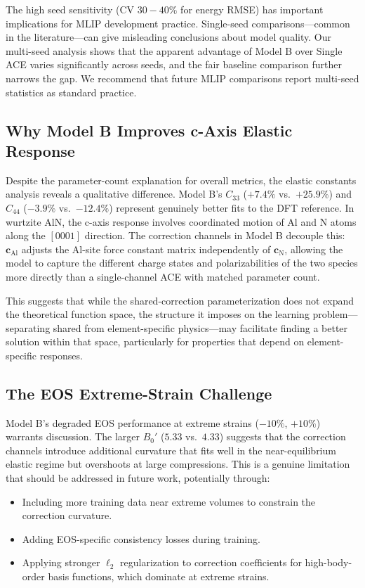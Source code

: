 \documentclass[twoside,prb,aps,floatfix,superscriptaddress,longbibliography]{revtex4-2}
\begin{document}
The high seed sensitivity (CV $30{-}40\%$ for energy RMSE) has important implications for MLIP development practice. Single-seed comparisons---common in the literature---can give misleading conclusions about model quality. Our multi-seed analysis shows that the apparent advantage of Model B over Single ACE varies significantly across seeds, and the fair baseline comparison further narrows the gap. We recommend that future MLIP comparisons report multi-seed statistics as standard practice.

\subsection{Why Model B Improves c-Axis Elastic Response}

Despite the parameter-count explanation for overall metrics, the elastic constants analysis reveals a qualitative difference. Model B's $C_{33}$ ($+7.4\%$ vs.\ $+25.9\%$) and $C_{44}$ ($-3.9\%$ vs.\ $-12.4\%$) represent genuinely better fits to the DFT reference. In wurtzite AlN, the c-axis response involves coordinated motion of Al and N atoms along the $[0001]$ direction. The correction channels in Model B decouple this: $\mathbf{c}_{\mathrm{Al}}$ adjusts the Al-site force constant matrix independently of $\mathbf{c}_{\mathrm{N}}$, allowing the model to capture the different charge states and polarizabilities of the two species more directly than a single-channel ACE with matched parameter count.

This suggests that while the shared-correction parameterization does not expand the theoretical function space, the structure it imposes on the learning problem---separating shared from element-specific physics---may facilitate finding a better solution within that space, particularly for properties that depend on element-specific responses.

\subsection{The EOS Extreme-Strain Challenge}

Model B's degraded EOS performance at extreme strains ($-10\%$, $+10\%$) warrants discussion. The larger $B_0'$ ($5.33$ vs.\ $4.33$) suggests that the correction channels introduce additional curvature that fits well in the near-equilibrium elastic regime but overshoots at large compressions. This is a genuine limitation that should be addressed in future work, potentially through:
\begin{itemize}
    \item Including more training data near extreme volumes to constrain the correction curvature.
    \item Adding EOS-specific consistency losses during training.
    \item Applying stronger $\ell_2$ regularization to correction coefficients for high-body-order basis functions, which dominate at extreme strains.
\end{itemize}
\end{document}
